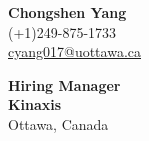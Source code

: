\documentclass[letterpaper,11pt]{article}
\begin{document}
\begin{flushleft}
    {\Huge \textbf{Chongshen Yang}} \\ \vspace{2pt}
    (+1)249-875-1733 \\
    \href{mailto:cyang017@uottawa.ca}{ cyang017@uottawa.ca }
\end{flushleft}

\vspace{1cm}

\begin{flushleft}
    \textbf{Hiring Manager} \\
    \textbf{Kinaxis} \\
    Ottawa, Canada
\end{flushleft}

\vspace{0.5cm}
\end{document}
